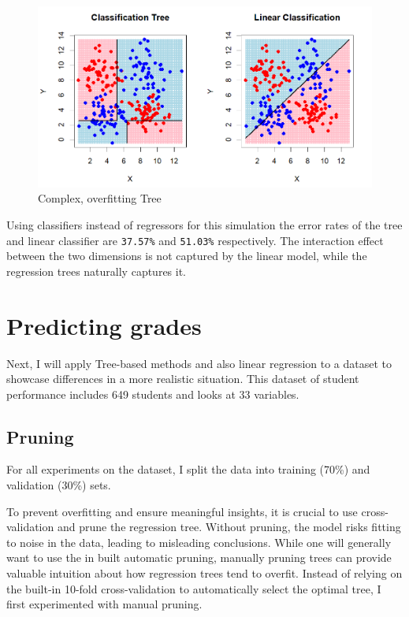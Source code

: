 \documentclass[12pt]{article}
\begin{document}
\begin{figure}
    \centering
    \includegraphics[scale=0.30]{NLD Pred.png}
    \caption{Complex, overfitting Tree}
\end{figure}

Using classifiers instead of regressors for this simulation the error rates of the tree and linear classifier are \texttt{37.57\%} and \texttt{51.03\%} respectively. The interaction effect between the two dimensions is not captured by the linear model, while the regression trees naturally captures it.


\section{Predicting grades}

Next, I will apply Tree-based methods and also linear regression to a dataset to showcase differences in a more realistic situation. This dataset of student performance includes 649 students and looks at 33 variables.

\subsection{Pruning}

For all experiments on the dataset, I split the data into training (70\%) and validation (30\%) sets.

To prevent overfitting and ensure meaningful insights, it is crucial to use cross-validation and prune the regression tree. Without pruning, the model risks fitting to noise in the data, leading to misleading conclusions. While one will generally want to use the in built automatic pruning, manually pruning trees can provide valuable intuition about how regression trees tend to overfit. Instead of relying on the built-in 10-fold cross-validation to automatically select the optimal tree, I first experimented with manual pruning.
\end{document}
